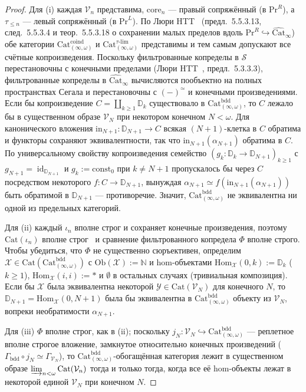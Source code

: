 \documentclass[11pt]{article}
\theoremstyle{plain}
\theoremstyle{definition}
\newcommand{\Ob}{\mathrm{Ob}}
\newcommand{\Hom}{\mathrm{Hom}}
\newcommand{\Cat}{\mathrm{Cat}}
\DeclareMathOperator{\id}{id}
\begin{document}
\begin{proof}
Для (i) каждая $\mathcal{V}_n$ представима, $\mathrm{core}_n$ — правый сопряжённый (в $\mathrm{Pr}^R$), а $\tau_{\le n}$ — левый сопряжённый (в $\mathrm{Pr}^L$). По Люри HTT~\cite{LurieHTT} (предл.~5.5.3.13, след.~5.5.3.4 и теор.~5.5.3.18 о сохранении малых пределов вдоль $\mathrm{Pr}^R \hookrightarrow \widehat{\Cat}_\infty$) обе категории $\Cat_{(\infty,\omega)}^{\mathrm{coind}}$ и $\Cat_{(\infty,\omega)}^{\tau\text{-}\mathrm{lim}}$ представимы и тем самым допускают все счётные копроизведения. Поскольку фильтрованные копределы в $\mathcal{S}$ перестановочны с конечными пределами (Люри HTT~\cite{LurieHTT}, предл.~5.3.3.3), фильтрованные копределы в $\widehat{\Cat}_\infty$ вычисляются пообъектно на полных пространствах Сегала и перестановочны с $(-)^{\simeq}$ и конечными произведениями. Если бы копроизведение $C = \coprod_{k \ge 1} \mathbb{D}_k$ существовало в $\Cat_{(\infty,\omega)}^{\mathrm{bdd}}$, то $C$ лежало бы в существенном образе $\mathcal{V}_N$ при некотором конечном $N < \omega$. Для канонического вложения $\mathrm{in}_{N+1} : \mathbb{D}_{N+1} \to C$ всякая $(N+1)$-клетка в $C$ обратима и функторы сохраняют эквивалентности, так что $\mathrm{in}_{N+1}(\alpha_{N+1})$ обратима в $C$. По универсальному свойству копроизведения семейство $(g_k : \mathbb{D}_k \to \mathbb{D}_{N+1})_{k \ge 1}$ с $g_{N+1} = \id_{\mathbb{D}_{N+1}}$ и $g_k := \mathrm{const}_0$ при $k \neq N+1$ пропускалось бы через $C$ посредством некоторого $f : C \to \mathbb{D}_{N+1}$, вынуждая $\alpha_{N+1} \simeq f(\mathrm{in}_{N+1}(\alpha_{N+1}))$ быть обратимой в $\mathbb{D}_{N+1}$ — противоречие. Значит, $\Cat_{(\infty,\omega)}^{\mathrm{bdd}}$ не эквивалентна ни одной из предельных категорий.

Для (ii) каждый $\iota_n$ вполне строг и сохраняет конечные произведения, поэтому $\Cat(\iota_n)$ вполне строг~\cite{GepnerHaugseng2015} и сравнение фильтрованного копредела $\Phi$ вполне строго. Чтобы убедиться, что $\Phi$ не существенно сюръективен, определим $\mathcal{X} \in \Cat(\Cat_{(\infty,\omega)}^{\mathrm{bdd}})$ с $\Ob(\mathcal{X}) := \mathbb{N}$ и hom-объектами $\Hom_{\mathcal{X}}(0, k) := \mathbb{D}_k$ ($k \ge 1$), $\Hom_{\mathcal{X}}(i, i) := *$ и $\emptyset$ в остальных случаях (тривиальная композиция). Если бы $\mathcal{X}$ была эквивалентна некоторой $\mathcal{Y} \in \Cat(\mathcal{V}_N)$ для конечного $N$, то $\mathbb{D}_{N+1} = \Hom_{\mathcal{X}}(0, N+1)$ была бы эквивалентна в $\Cat_{(\infty,\omega)}^{\mathrm{bdd}}$ объекту из $\mathcal{V}_N$, вопреки необратимости $\alpha_{N+1}$.

Для (iii) $\Phi$ вполне строг, как в (ii); поскольку $j_N : \mathcal{V}_N \hookrightarrow \Cat_{(\infty,\omega)}^{\mathrm{bdd}}$ — реплетное вполне строгое вложение, замкнутое относительно конечных произведений ($\Gamma_{\mathrm{bdd}} \circ j_N \simeq \Gamma_{\mathcal{V}_N}$), то $\Cat_{(\infty,\omega)}^{\mathrm{bdd}}$-обогащённая категория лежит в существенном образе $\varinjlim_{n < \omega} \Cat(\mathcal{V}_n)$ тогда и только тогда, когда все её hom-объекты лежат в некоторой единой $\mathcal{V}_N$ при конечном $N$.
\end{proof}
\end{document}
